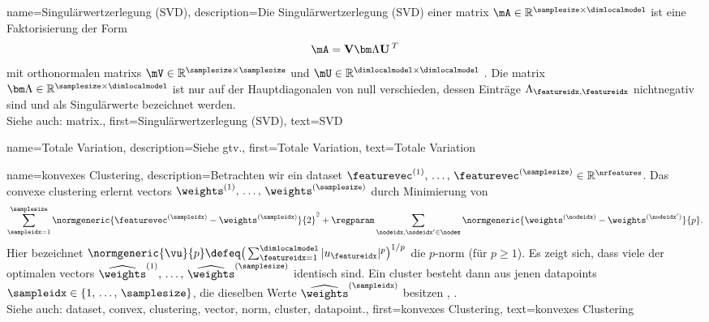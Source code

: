 {{{{
{name={Singulärwertzerlegung (SVD)}, 
  	description={Die 
  		Singulärwertzerlegung (SVD) einer \gls{matrix} 
		$\mA \in \mathbb{R}^{\samplesize \times \dimlocalmodel}$ 
		ist eine Faktorisierung der Form
		$$\mA = \mathbf{V} {\bm \Lambda} \mathbf{U}\,^{T}$$ 
		mit orthonormalen \glspl{matrix} 
		$\mV \in \mathbb{R}^{\samplesize \times \samplesize}$ 
		und $\mU \in \mathbb{R}^{\dimlocalmodel \times \dimlocalmodel}$ 
		\cite{GolubVanLoanBook}. 
		Die \gls{matrix} ${\bm \Lambda} \in \mathbb{R}^{\samplesize \times \dimlocalmodel}$ 
		ist nur auf der Hauptdiagonalen von null verschieden, 
		dessen Einträge $\Lambda_{\featureidx,\featureidx}$ 
		nichtnegativ sind und als Singulärwerte bezeichnet werden.\\
		Siehe auch: \gls{matrix}.},
	first={Singulärwertzerlegung (SVD)},
	text={SVD} 
}

{name={Totale Variation}, 
	description={Siehe \gls{gtv}.},
	first={Totale Variation},
	text={Totale Variation} 
}

{name={konvexes Clustering}, 
 	description={Betrachten wir ein \gls{dataset} 
 		$\featurevec^{(1)}, \,\ldots, \,\featurevec^{(\samplesize)} \in \mathbb{R}^{\nrfeatures}$. 
 		Das \gls{convex}e \gls{clustering} erlernt \glspl{vector} 
 		$\weights^{(1)}, \,\ldots, \,\weights^{(\samplesize)}$ durch Minimierung von
 		$$\sum_{\sampleidx=1}^{\samplesize} \normgeneric{\featurevec^{(\sampleidx)} - \weights^{(\sampleidx)}}{2}^2 + 
 		\regparam \sum_{\nodeidx,\nodeidx' \in \nodes} \normgeneric{\weights^{(\nodeidx)} - \weights^{(\nodeidx')}}{p}.$$ 
		Hier bezeichnet $\normgeneric{\vu}{p} \defeq \big( \sum_{\featureidx=1}^{\dimlocalmodel} |u_{\featureidx}|^{p} \big)^{1/p}$ 
		die $p$-\gls{norm} (für $p \geq 1$).  
		Es zeigt sich, dass viele der optimalen \glspl{vector} 
		$\widehat{\weights}^{(1)}, \,\ldots, \,\widehat{\weights}^{(\samplesize)}$ identisch sind. 
		Ein \gls{cluster} besteht dann aus jenen \glspl{datapoint} $\sampleidx \in \{1, \,\ldots, \,\samplesize\}$, 
		die dieselben Werte $\widehat{\weights}^{(\sampleidx)}$ besitzen \cite{JMLR:v22:18-694}, \cite{Pelckmans2005}.\\
		Siehe auch: \gls{dataset}, \gls{convex}, \gls{clustering}, \gls{vector}, \gls{norm}, \gls{cluster}, \gls{datapoint}.},
 	first={konvexes Clustering},
	text={konvexes Clustering} 
}

}}}}
